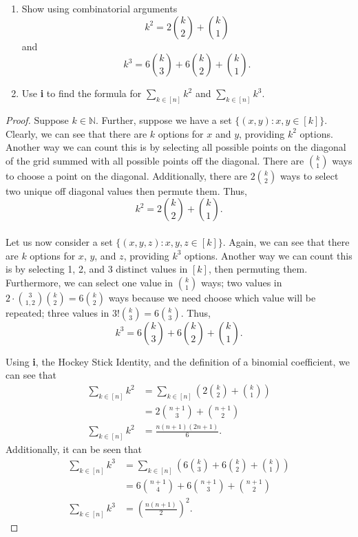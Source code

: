\documentclass[ 12pt ]{article}
\begin{document}
\begin{enumerate}
	\item[\textbf{2.}]
		\begin{enumerate}
			\item[\textbf{i.}] Show using combinatorial arguments $$k^2 = 2\binom{k}{2} + \binom{k}{1}$$ and $$k^3 = 6\binom{k}{3} + 6\binom{k}{2} + \binom{k}{1}.$$
			\item[\textbf{ii.}] Use \textbf{i} to find the formula for $\sum_{k \in [n]} k^2$ and $\sum_{k \in [n]} k^3$.
		\end{enumerate}
		\newpage

		\begin{proof}
			\item[\textbf{i.}] Suppose $k \in \mathbb{N}$. Further, suppose we have a set $\{ (x, y) : x, y \in [k] \}$. Clearly, we can see that there are $k$ options for
				$x$ and $y$, providing $k^2$ options. Another way we can count this is by selecting all possible points on the diagonal of the grid summed with all possible points
				off the diagonal. There are $\binom{k}{1}$ ways to choose a point on the diagonal. Additionally, there are $2\binom{k}{2}$ ways to select two unique off diagonal
				values then permute them. Thus, $$k^2 = 2\binom{k}{2} + \binom{k}{1}.$$ \\
				Let us now consider a set $\{ (x, y, z) : x, y, z \in [k] \}$. Again, we can see that there are $k$ options for $x$, $y$, and $z$, providing $k^3$ options. Another
				way we can count this is by selecting 1, 2, and 3 distinct values in $[k]$, then permuting them. Furthermore, we can select one value in $\binom{k}{1}$ ways; two
				values in $2 \cdot \binom{3}{1, 2} \binom{k}{2} = 6\binom{k}{2}$ ways because we need choose which value will be repeated; three values in $3! \binom{k}{3} = 
				6\binom{k}{3}$. Thus, $$k^3 = 6\binom{k}{3} + 6\binom{k}{2} + \binom{k}{1}.$$
			\item[\textbf{ii.}] Using \textbf{i}, the Hockey Stick Identity, and the definition of a binomial coefficient, we can see that
				\begin{align*}
					\sum_{k \in [n]} k^2 &= \sum_{k \in [n]} \left ( 2\binom{k}{2} + \binom{k}{1} \right ) \\
					&= 2\binom{n+1}{3} + \binom{n+1}{2} \\
					\sum_{k \in [n]} k^2 &= \frac{n(n+1)(2n+1)}{6}.
				\end{align*}
				Additionally, it can be seen that
				\begin{align*}
					\sum_{k \in [n]} k^3 &= \sum_{k \in [n]} \left ( 6\binom{k}{3} + 6\binom{k}{2} + \binom{k}{1} \right ) \\
					&= 6\binom{n+1}{4} + 6\binom{n+1}{3} + \binom{n+1}{2} \\
					\sum_{k \in [n]} k^3 &= \left ( \frac{n(n+1)}{2} \right )^2.
				\end{align*}
		\end{proof}



\end{enumerate}
\end{document}
